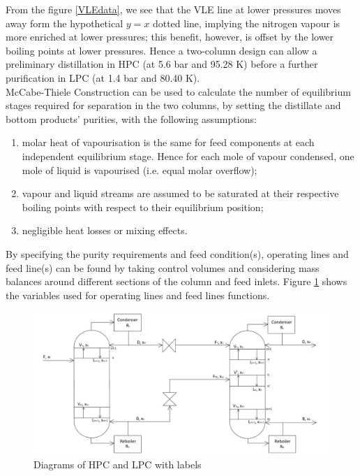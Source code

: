         \noindent From the figure \ref{VLEdata}, we see that the VLE line at lower pressures moves away form the hypothetical $y=x$ dotted line, implying the nitrogen vapour is more enriched at lower pressures; this benefit, however, is offset by the lower boiling points at lower pressures. Hence a two-column design can allow a preliminary distillation in HPC (at 5.6 bar and 95.28 K) before a further purification in LPC (at 1.4 bar and 80.40 K). \\
        McCabe-Thiele Construction can be used to calculate the number of equilibrium stages required for separation in the two columns, by setting the distillate and bottom products' purities, with the following assumptions:
        \begin{enumerate}
            \item molar heat of vapourisation is the same for feed components at each independent equilibrium stage. Hence for each mole of vapour condensed, one mole of liquid is vapourised (i.e. equal molar overflow);
            \item vapour and liquid streams are assumed to be saturated at their respective boiling points with respect to their equilibrium position;
            \item negligible heat losses or mixing effects.
        \end{enumerate}
        By specifying the purity requirements and feed condition(s), operating lines and feed line(s) can be found by taking control volumes and considering mass balances around different sections of the column and feed inlets. Figure \ref{labelled_columns_diagram} shows the variables used for operating lines and feed lines functions.
        \begin{figure}[H]
            \centering
            \includegraphics[scale=0.43]{labelled_columns_diagram.jpg}
            \caption{Diagrams of HPC and LPC with labels}
            \label{labelled_columns_diagram}
        \end{figure}
